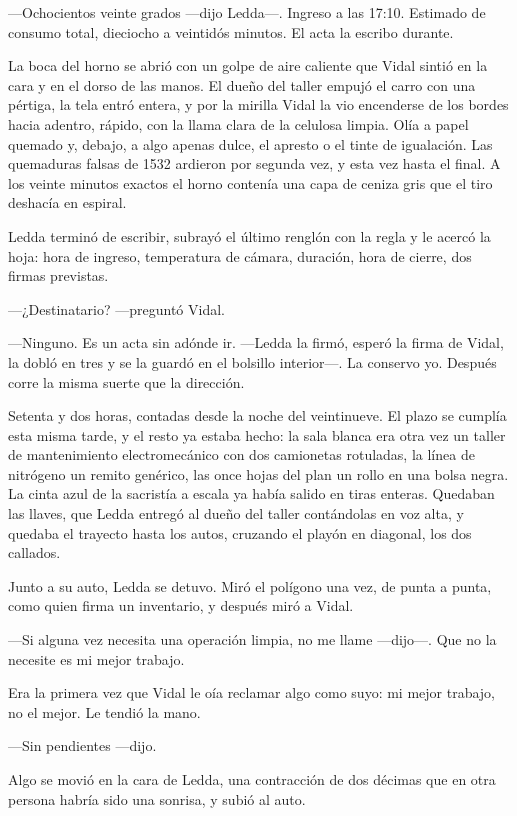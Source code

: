 ---Ochocientos veinte grados ---dijo Ledda---. Ingreso a las 17:10. Estimado de consumo total, dieciocho a veintidós minutos. El acta la escribo durante.

La boca del horno se abrió con un golpe de aire caliente que Vidal sintió en la cara y en el dorso de las manos. El dueño del taller empujó el carro con una pértiga, la tela entró entera, y por la mirilla Vidal la vio encenderse de los bordes hacia adentro, rápido, con la llama clara de la celulosa limpia. Olía a papel quemado y, debajo, a algo apenas dulce, el apresto o el tinte de igualación. Las quemaduras falsas de 1532 ardieron por segunda vez, y esta vez hasta el final. A los veinte minutos exactos el horno contenía una capa de ceniza gris que el tiro deshacía en espiral.

Ledda terminó de escribir, subrayó el último renglón con la regla y le acercó la hoja: hora de ingreso, temperatura de cámara, duración, hora de cierre, dos firmas previstas.

---¿Destinatario? ---preguntó Vidal.

---Ninguno. Es un acta sin adónde ir. ---Ledda la firmó, esperó la firma de Vidal, la dobló en tres y se la guardó en el bolsillo interior---. La conservo yo. Después corre la misma suerte que la dirección.

Setenta y dos horas, contadas desde la noche del veintinueve. El plazo se cumplía esta misma tarde, y el resto ya estaba hecho: la sala blanca era otra vez un taller de mantenimiento electromecánico con dos camionetas rotuladas, la línea de nitrógeno un remito genérico, las once hojas del plan un rollo en una bolsa negra. La cinta azul de la sacristía a escala ya había salido en tiras enteras. Quedaban las llaves, que Ledda entregó al dueño del taller contándolas en voz alta, y quedaba el trayecto hasta los autos, cruzando el playón en diagonal, los dos callados.

Junto a su auto, Ledda se detuvo. Miró el polígono una vez, de punta a punta, como quien firma un inventario, y después miró a Vidal.

---Si alguna vez necesita una operación limpia, no me llame ---dijo---. Que no la necesite es mi mejor trabajo.

Era la primera vez que Vidal le oía reclamar algo como suyo: mi mejor trabajo, no el mejor. Le tendió la mano.

---Sin pendientes ---dijo.

Algo se movió en la cara de Ledda, una contracción de dos décimas que en otra persona habría sido una sonrisa, y subió al auto.


